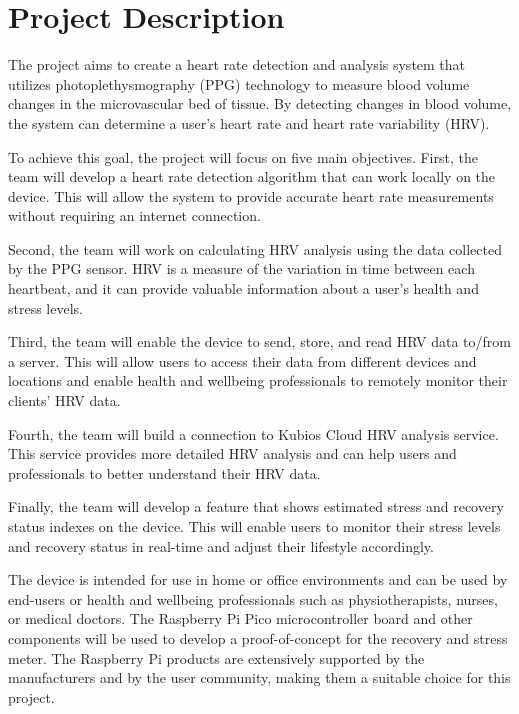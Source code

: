 \documentclass{article}
\begin{document}
\section{Project Description}

The project aims to create a heart rate detection and analysis system that utilizes photoplethysmography (PPG) technology to measure blood volume changes in the microvascular bed of tissue. By detecting changes in blood volume, the system can determine a user's heart rate and heart rate variability (HRV).



To achieve this goal, the project will focus on five main objectives. First, the team will develop a heart rate detection algorithm that can work locally on the device. This will allow the system to provide accurate heart rate measurements without requiring an internet connection.



Second, the team will work on calculating HRV analysis using the data collected by the PPG sensor. HRV is a measure of the variation in time between each heartbeat, and it can provide valuable information about a user's health and stress levels.



Third, the team will enable the device to send, store, and read HRV data to/from a server. This will allow users to access their data from different devices and locations and enable health and wellbeing professionals to remotely monitor their clients' HRV data.



Fourth, the team will build a connection to Kubios Cloud HRV analysis service. This service provides more detailed HRV analysis and can help users and professionals to better understand their HRV data.



Finally, the team will develop a feature that shows estimated stress and recovery status indexes on the device. This will enable users to monitor their stress levels and recovery status in real-time and adjust their lifestyle accordingly.


The device is intended for use in home or office environments and can be used by end-users or health and wellbeing professionals such as physiotherapists, nurses, or medical doctors. The Raspberry Pi Pico microcontroller board and other components will be used to develop a proof-of-concept for the recovery and stress meter. The Raspberry Pi products are extensively supported by the manufacturers and by the user community, making them a suitable choice for this project.
\end{document}
